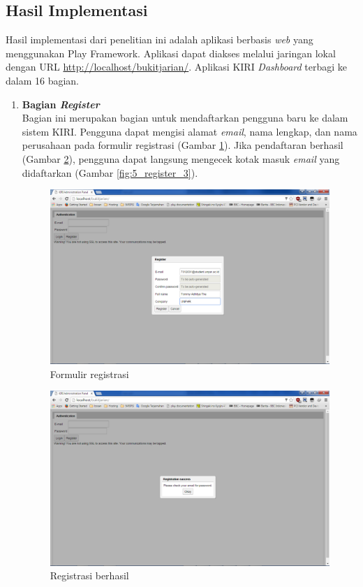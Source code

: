 \subsection{Hasil Implementasi}
\label{sec:hasilimplementasi}
Hasil implementasi dari penelitian ini adalah aplikasi berbasis \textit{web} yang menggunakan Play Framework. Aplikasi dapat diakses melalui jaringan lokal dengan URL \url{http://localhost/bukitjarian/}. Aplikasi KIRI \textit{Dashboard} terbagi ke dalam 16 bagian.
\begin{enumerate}
	\item \textbf{Bagian \textit{Register}}\\
	Bagian ini merupakan bagian untuk mendaftarkan pengguna baru ke dalam sistem KIRI. Pengguna dapat mengisi alamat \textit{email}, nama lengkap, dan nama perusahaan pada formulir registrasi (Gambar \ref{fig:5_register_1}). Jika pendaftaran berhasil (Gambar \ref{fig:5_register_2}), pengguna dapat langsung mengecek kotak masuk \textit{email} yang didaftarkan (Gambar \ref{fig:5_register_3}).

	\begin{figure}[htbp]
		\centering
			\includegraphics[scale=0.45]{Gambar/5_register_1.png}
		\caption{Formulir registrasi}
		\label{fig:5_register_1}
	\end{figure}

	\begin{figure}[htbp]
		\centering
			\includegraphics[scale=0.45]{Gambar/5_register_2.png}
		\caption{Registrasi berhasil}
		\label{fig:5_register_2}
	\end{figure}


\end{enumerate}
